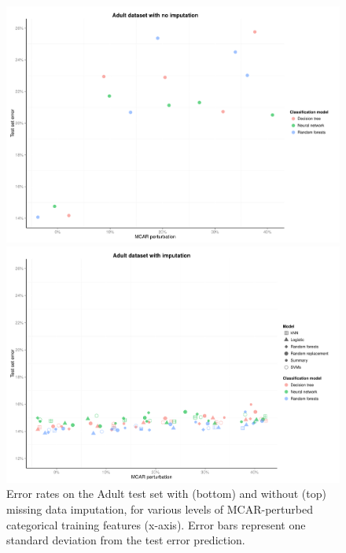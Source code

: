 \documentclass[10pt]{book}
\theoremstyle{definition}
\begin{document}
\begin{figure}[h!]
\includegraphics[scale=0.6, center]{figure/test-errors-adult-no-imp-mcar}\par
\includegraphics[scale=0.6, center]{figure/test-errors-adult-imp-mcar}\par
   \caption{\footnotesize Error rates on the Adult test set with (bottom) and without (top) missing data imputation, for various levels of MCAR-perturbed categorical training features (x-axis). Error bars represent one standard deviation from the test error prediction.}
   \label{fig:test-error-adult}
\end{figure}
\end{document}
